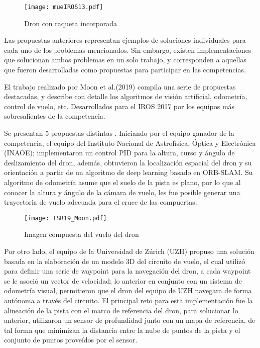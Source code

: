 \begin{figure}[ht]
    \centering
    \texttt{[image: mueIROS13.pdf]}
    \caption{Dron con raqueta incorporada \citet{mueller2013computationally}}
    \label{fig:mueIROS13}
\end{figure}

Las propuestas anteriores representan ejemplos de soluciones individuales para cada uno de los problemas mencionados. Sin embargo, existen implementaciones que solucionan ambos problemas en un solo trabajo, y corresponden a aquellas que fueron desarrolladas como propuestas para participar en las competencias.

El trabajo realizado por Moon et al.(2019) \citet{moon2019challenges} compila una serie de propuestas destacadas, y describe con detalle los algoritmos de visión artificial, odometría, control de vuelo, etc. Desarrollados para el IROS 2017 por los equipos más sobresalientes de la competencia. 

Se presentan 5 propuestas distintas \citet{moon2019challenges}. Iniciando por el equipo ganador de la competencia, el equipo del Instituto Nacional de Astrofísica, Óptica y Electrónica (INAOE); implementaron un control PID para la altura, curso y ángulo de deslizamiento del dron, además, obtuvieron la localización espacial del dron y su orientación a partir de un algoritmo de  deep learning basado en ORB-SLAM. Su algoritmo de odometría asume que el suelo de la pista es plano, por lo que al conocer la altura y ángulo de la cámara de vuelo, les fue posible generar una trayectoria de vuelo adecuada para el cruce de las compuertas. 

\begin{figure}[ht]
    \centering
    \texttt{[image: ISR19\_Moon.pdf]}
    \caption{Imagen compuesta del vuelo del dron  \citet{moon2019challenges}}
    \label{fig:ISR19_Moon}
\end{figure}


Por otro lado, el equipo de la Universidad de Zúrich (UZH) propuso una solución basada en la elaboración de un modelo 3D del circuito de vuelo, el cual utilizó para definir una serie de waypoint para la navegación del dron, a cada waypoint se le asoció un vector de velocidad; lo anterior en conjunto con un sistema de odometría visual, permitieron que el dron del equipo de UZH navegara de forma autónoma a través del circuito. 
El principal reto para esta implementación fue la alineación de la pista con el marco de referencia del dron, para solucionar lo anterior, utilizaron  un sensor de profundidad junto con un mapa de referencia, de tal forma que minimizan la distancia entre la nube de puntos de la pista y el conjunto de puntos proveídos por el sensor.

